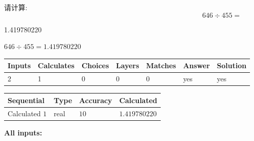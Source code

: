 \documentclass{ctexart}
\begin{document}
请计算:
\begin{equation}
646  \div    %
455 = \nonumber
\end{equation}
 
 
 
\noindent{}
 
 

1.419780220
 
 
\noindent{}
 
 

 
 
 
\noindent{}
 
 

$ %
646 \div  %
455=   %
1.419780220$
 
 
\noindent{}
 
 

 
   
   
   
   
\noindent\begin{tabular}{|l|l|l|l|l|l|l|}
 \hline
Inputs & Calculates & Choices & Layers & Matches & Answer & Solution \\ \hline
 2  & 
 1  & 
 0
  & 
 0  & 
 0  & 
  yes & 
  yes 
  \\ \hline
 \end{tabular}
   
   
   
   
\noindent{}
   
   
  
  
\noindent\begin{tabular}{|l|l|l|l|}
\hline
 Sequential & Type & Accuracy & Calculated \\ 
\hline
 
 
  Calculated $  1 $ & real & $  10  $ & 
 $ 1.419780220 $ 
 \\  \hline  
 \end{tabular}
   
   
   
   
\noindent\vspace{0.1in}\hspace{-0.08in} {\textbf{\Large{All inputs: }}}
   
\end{document}

